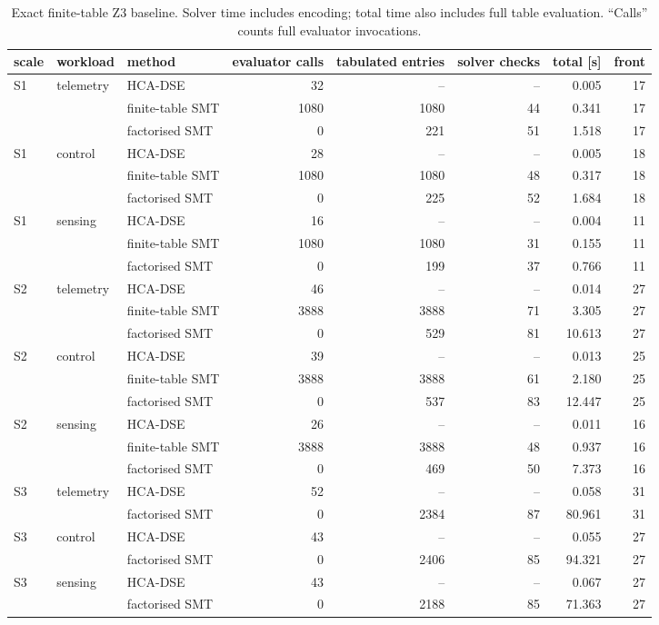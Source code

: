 \documentclass[preprint,11pt,3p]{elsarticle}
\theoremstyle{plain}
\theoremstyle{definition}
\begin{document}
\begin{table}[!htbp]\centering
\caption{Exact finite-table Z3 baseline. Solver time includes encoding; total time also
includes full table evaluation. ``Calls'' counts full evaluator invocations.}
\label{tab:solver}\scriptsize
\begin{tabular}{lllrrrrr}
\toprule
scale & workload & method & evaluator calls & tabulated entries & solver checks & total [s] & front \\
\midrule
S1 & telemetry & HCA-DSE & 32 & -- & -- & 0.005 & 17 \\
 &  & finite-table SMT & 1080 & 1080 & 44 & 0.341 & 17 \\
 &  & factorised SMT & 0 & 221 & 51 & 1.518 & 17 \\
S1 & control & HCA-DSE & 28 & -- & -- & 0.005 & 18 \\
 &  & finite-table SMT & 1080 & 1080 & 48 & 0.317 & 18 \\
 &  & factorised SMT & 0 & 225 & 52 & 1.684 & 18 \\
S1 & sensing & HCA-DSE & 16 & -- & -- & 0.004 & 11 \\
 &  & finite-table SMT & 1080 & 1080 & 31 & 0.155 & 11 \\
 &  & factorised SMT & 0 & 199 & 37 & 0.766 & 11 \\
S2 & telemetry & HCA-DSE & 46 & -- & -- & 0.014 & 27 \\
 &  & finite-table SMT & 3888 & 3888 & 71 & 3.305 & 27 \\
 &  & factorised SMT & 0 & 529 & 81 & 10.613 & 27 \\
S2 & control & HCA-DSE & 39 & -- & -- & 0.013 & 25 \\
 &  & finite-table SMT & 3888 & 3888 & 61 & 2.180 & 25 \\
 &  & factorised SMT & 0 & 537 & 83 & 12.447 & 25 \\
S2 & sensing & HCA-DSE & 26 & -- & -- & 0.011 & 16 \\
 &  & finite-table SMT & 3888 & 3888 & 48 & 0.937 & 16 \\
 &  & factorised SMT & 0 & 469 & 50 & 7.373 & 16 \\
S3 & telemetry & HCA-DSE & 52 & -- & -- & 0.058 & 31 \\
 &  & factorised SMT & 0 & 2384 & 87 & 80.961 & 31 \\
S3 & control & HCA-DSE & 43 & -- & -- & 0.055 & 27 \\
 &  & factorised SMT & 0 & 2406 & 85 & 94.321 & 27 \\
S3 & sensing & HCA-DSE & 43 & -- & -- & 0.067 & 27 \\
 &  & factorised SMT & 0 & 2188 & 85 & 71.363 & 27 \\
\bottomrule
\end{tabular}
\end{table}
\FloatBarrier
\end{document}
